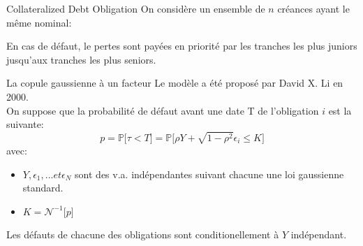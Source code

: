 \documentclass{beamer}
\begin{document}
\begin{frame}{Collateralized Debt Obligation}
On considère un ensemble de $n$ créances ayant le même nominal:\\
\vspace{0.5cm}
\begin{center}
\end{center}
En cas de défaut, le pertes sont payées en priorité par les tranches les plus juniors jusqu'aux tranches les plus seniors.
\end{frame}

\begin{frame}{La copule gaussienne à un facteur}
Le modèle a été proposé par David X. Li en 2000.\\
\vspace{0.5cm}
On suppose que la probabilité de défaut avant une date T de l'obligation $i$ est la suivante:\\
\[
p=\mathbb{P}\big[\tau < T\big]=\mathbb{P}\big[\rho Y + \sqrt{1-\rho^2} \epsilon_i \leq K\big]
\]
avec:
\begin{itemize}
\item $Y, \epsilon_1, ... et \epsilon_N$ sont des v.a. indépendantes suivant chacune une loi gaussienne standard.\\
\item $K = \mathcal{N}^{-1}\big[p\big]$\\
\end{itemize}
\vspace{0.5cm}
Les défauts de chacune des obligations sont conditionellement à $Y$ indépendant.
\end{frame}
\end{document}
